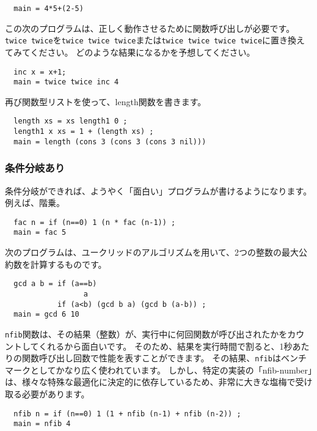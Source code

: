 \documentclass{jarticle}
\begin{document}
\begin{verbatim}
  main = 4*5+(2-5)
\end{verbatim}

この次のプログラムは、正しく動作させるために関数呼び出しが必要です。
\texttt{twice twice}を\texttt{twice twice twice}または\texttt{twice twice twice twice}に置き換えてみてください。
どのような結果になるかを予想してください。

\begin{verbatim}
  inc x = x+1;
  main = twice twice inc 4
\end{verbatim}

再び関数型リストを使って、length関数を書きます。

\begin{verbatim}
  length xs = xs length1 0 ;
  length1 x xs = 1 + (length xs) ;
  main = length (cons 3 (cons 3 (cons 3 nil)))
\end{verbatim}

\subsubsection{条件分岐あり}

条件分岐ができれば、ようやく「面白い」プログラムが書けるようになります。
例えば、階乗。

\begin{verbatim}
  fac n = if (n==0) 1 (n * fac (n-1)) ;
  main = fac 5
\end{verbatim}

次のプログラムは、ユークリッドのアルゴリズムを用いて、2つの整数の最大公約数を計算するものです。

\begin{verbatim}
  gcd a b = if (a==b)
                  a
            if (a<b) (gcd b a) (gcd b (a-b)) ;
  main = gcd 6 10
\end{verbatim}

\texttt{nfib}関数は、その結果（整数）が、実行中に何回関数が呼び出されたかをカウントしてくれるから面白いです。
そのため、結果を実行時間で割ると、1秒あたりの関数呼び出し回数で性能を表すことができます。
その結果、\texttt{nfib}はベンチマークとしてかなり広く使われています。
しかし、特定の実装の「nfib-number」は、様々な特殊な最適化に決定的に依存しているため、非常に大きな塩梅で受け取る必要があります。

\begin{verbatim}
  nfib n = if (n==0) 1 (1 + nfib (n-1) + nfib (n-2)) ;
  main = nfib 4
\end{verbatim}
\end{document}
